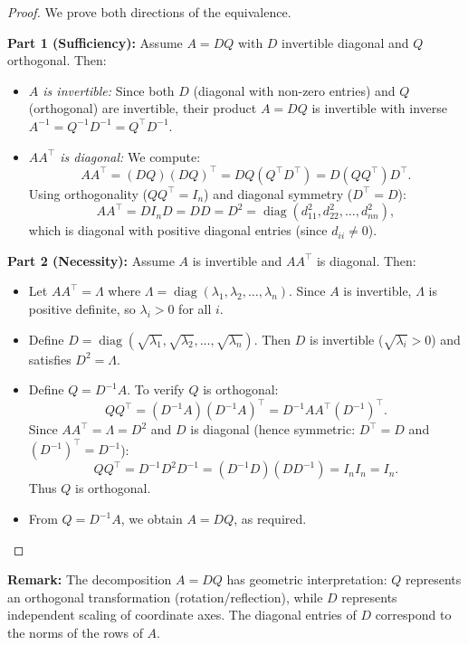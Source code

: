 \documentclass[
	11pt, %
	fleqn, %
	a4paper, %
]{LegrandOrangeBook}
\begin{document}
\begin{proof}
We prove both directions of the equivalence.

\textbf{Part 1 (Sufficiency):} Assume \(A = D Q\) with \(D\) invertible diagonal and \(Q\) orthogonal. Then:
\begin{itemize}
\item \textit{\(A\) is invertible:} Since both \(D\) (diagonal with non-zero entries) and \(Q\) (orthogonal) are invertible, their product \(A = D Q\) is invertible with inverse \(A^{-1} = Q^{-1} D^{-1} = Q^\top D^{-1}\).

\item \textit{\(A A^\top\) is diagonal:} We compute:
\[
A A^\top = (D Q)(D Q)^\top = D Q (Q^\top D^\top) = D (Q Q^\top) D^\top.
\]
Using orthogonality (\(Q Q^\top = I_n\)) and diagonal symmetry (\(D^\top = D\)):
\[
A A^\top = D I_n D = D D = D^2 = \operatorname{diag}(d_{11}^2, d_{22}^2, \dots, d_{nn}^2),
\]
which is diagonal with positive diagonal entries (since \(d_{ii} \neq 0\)).
\end{itemize}

\textbf{Part 2 (Necessity):} Assume \(A\) is invertible and \(A A^\top\) is diagonal. Then:
\begin{itemize}
\item Let \(A A^\top = \Lambda\) where \(\Lambda = \operatorname{diag}(\lambda_1, \lambda_2, \dots, \lambda_n)\). Since \(A\) is invertible, \(\Lambda\) is positive definite, so \(\lambda_i > 0\) for all \(i\).

\item Define \(D = \operatorname{diag}(\sqrt{\lambda_1}, \sqrt{\lambda_2}, \dots, \sqrt{\lambda_n})\). Then \(D\) is invertible (\(\sqrt{\lambda_i} > 0\)) and satisfies \(D^2 = \Lambda\).

\item Define \(Q = D^{-1} A\). To verify \(Q\) is orthogonal:
\[
Q Q^\top = (D^{-1} A)(D^{-1} A)^\top = D^{-1} A A^\top (D^{-1})^\top.
\]
Since \(A A^\top = \Lambda = D^2\) and \(D\) is diagonal (hence symmetric: \(D^\top = D\) and \((D^{-1})^\top = D^{-1}\)):
\[
Q Q^\top = D^{-1} D^2 D^{-1} = (D^{-1} D) (D D^{-1}) = I_n I_n = I_n.
\]
Thus \(Q\) is orthogonal.

\item From \(Q = D^{-1} A\), we obtain \(A = D Q\), as required.
\end{itemize}
\end{proof}

\textbf{Remark:} The decomposition \(A = D Q\) has geometric interpretation: \(Q\) represents an orthogonal transformation (rotation/reflection), while \(D\) represents independent scaling of coordinate axes. The diagonal entries of \(D\) correspond to the norms of the rows of \(A\).
\end{document}
